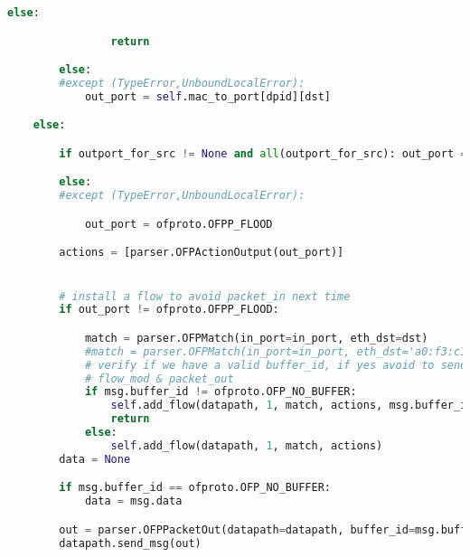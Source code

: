 \begin{lstlisting}[language = Python, caption={The User Segregation Mac Learning Application}, label={lst:userseg-code}]
			else:

				return

		else:
		#except (TypeError,UnboundLocalError):		
			out_port = self.mac_to_port[dpid][dst]		

	else:

		if outport_for_src != None and all(outport_for_src): out_port = int(outport_for_src[0])

		else:
		#except (TypeError,UnboundLocalError):

			out_port = ofproto.OFPP_FLOOD

		actions = [parser.OFPActionOutput(out_port)]


		# install a flow to avoid packet_in next time
		if out_port != ofproto.OFPP_FLOOD:

			match = parser.OFPMatch(in_port=in_port, eth_dst=dst)
			#match = parser.OFPMatch(in_port=in_port, eth_dst='a0:f3:c1:77:d8:36')
			# verify if we have a valid buffer_id, if yes avoid to send both
			# flow_mod & packet_out
			if msg.buffer_id != ofproto.OFP_NO_BUFFER:
				self.add_flow(datapath, 1, match, actions, msg.buffer_id)
				return
			else:
				self.add_flow(datapath, 1, match, actions)
		data = None

		if msg.buffer_id == ofproto.OFP_NO_BUFFER:
			data = msg.data

		out = parser.OFPPacketOut(datapath=datapath, buffer_id=msg.buffer_id, in_port=in_port, actions=actions, data=data)
		datapath.send_msg(out)

\end{lstlisting}

